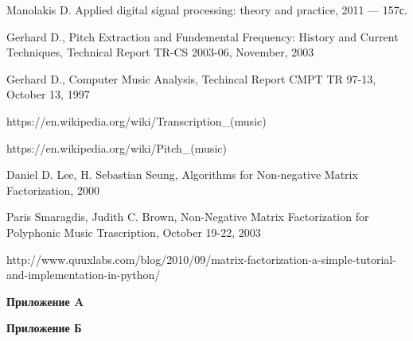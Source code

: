 \documentclass[oneside, final, 14pt]{extarticle}
\begin{document}
\cleardoublepage
{}
\begin{thebibliography}{0}

   Manolakis D. Applied digital signal
    processing: theory and practice, 2011 --- 157с.


   Gerhard D., Pitch Extraction and Fundemental Frequency:
    History and Current Techniques, Technical Report TR-CS 2003-06, November,
    2003

   Gerhard D., Computer Music Analysis, Techincal Report CMPT
    TR 97-13, October 13, 1997

   https://en.wikipedia.org/wiki/Transcription\_(music)

   https://en.wikipedia.org/wiki/Pitch\_(music)

   Daniel D. Lee, H. Sebastian Seung,
  Algorithms for Non-negative Matrix Factorization, 2000

   Paris Smaragdis, Judith C. Brown,
    Non-Negative Matrix Factorization
    for Polyphonic Music Trascription, October 19-22, 2003

   http://www.quuxlabs.com/blog/2010/09/matrix-factorization-a-simple-tutorial-and-implementation-in-python/

\end{thebibliography}

\cleardoublepage
\appendix
{\large \bf Приложение A} \\

{\large \bf Приложение Б} \\
\end{document}
